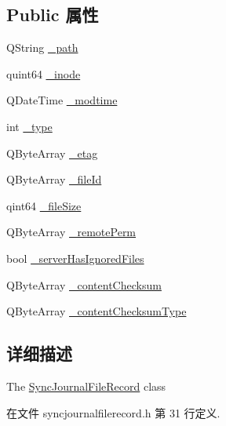 \subsection*{Public 属性}
\begin{DoxyCompactItemize}
\item 
Q\+String \hyperlink{class_o_c_c_1_1_sync_journal_file_record_a4f6b77f7429fcb31777de48365cc66a8}{\+\_\+path}
\item 
quint64 \hyperlink{class_o_c_c_1_1_sync_journal_file_record_ab8eb0bd5cc4e48c4e59e93268b4ea64f}{\+\_\+inode}
\item 
Q\+Date\+Time \hyperlink{class_o_c_c_1_1_sync_journal_file_record_a35961e9fd2266bdb42c5910eabfe19de}{\+\_\+modtime}
\item 
int \hyperlink{class_o_c_c_1_1_sync_journal_file_record_aae4f08d8802d5abe23a84d37812a06ee}{\+\_\+type}
\item 
Q\+Byte\+Array \hyperlink{class_o_c_c_1_1_sync_journal_file_record_ae8f8f611b59e417393ff3e1eb6d2b4ab}{\+\_\+etag}
\item 
Q\+Byte\+Array \hyperlink{class_o_c_c_1_1_sync_journal_file_record_ada945c0bf915d495c17dd7facbe1ff59}{\+\_\+file\+Id}
\item 
qint64 \hyperlink{class_o_c_c_1_1_sync_journal_file_record_a0387c0ccbd6efad6b91edd9bc0568262}{\+\_\+file\+Size}
\item 
Q\+Byte\+Array \hyperlink{class_o_c_c_1_1_sync_journal_file_record_a0a31a672869bd4e066555dd560b6954f}{\+\_\+remote\+Perm}
\item 
bool \hyperlink{class_o_c_c_1_1_sync_journal_file_record_aab1c42c017dc8f43da846f6d9817116a}{\+\_\+server\+Has\+Ignored\+Files}
\item 
Q\+Byte\+Array \hyperlink{class_o_c_c_1_1_sync_journal_file_record_ad6b03d2f3c603bae8c51b8caf51f2593}{\+\_\+content\+Checksum}
\item 
Q\+Byte\+Array \hyperlink{class_o_c_c_1_1_sync_journal_file_record_a3b73ab8838db49bd1cd5c293a503a356}{\+\_\+content\+Checksum\+Type}
\end{DoxyCompactItemize}


\subsection{详细描述}
The \hyperlink{class_o_c_c_1_1_sync_journal_file_record}{Sync\+Journal\+File\+Record} class 

在文件 syncjournalfilerecord.\+h 第 31 行定义.



